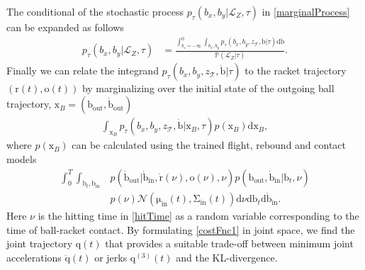 \documentclass[letterpaper, 10 pt, conference]{ieeeconf}
\newcommand{\boldvec}[1]{\boldsymbol{\mathrm{#1}}}
\let\vec\boldvec
\newcommand{\joint}{\vec{q}} %
\newcommand{\ballFull}{\vec{x}_{B}} %
\newcommand{\ball}{\vec{b}} %
\newcommand{\racket}{\vec{r}} %
\newcommand{\orient}{\vec{o}} %
\newcommand{\court}{\mathcal{T}} %
\newcommand{\prob}{\mathbb{P}} %
\newcommand{\landTime}{\tau} %
\newcommand{\landEvent}{\mathcal{L}} %
\newcommand{\hitTime}{\nu} %
\newcommand{\hitDist}{p(\nu)} %
\begin{document}
The conditional of the stochastic process $p_{\landTime}(b_x,b_y|\landEvent_Z,\landTime)$ in \eqref{marginalProcess} can be expanded as follows
%
\begin{align}
p_{\landTime}(b_x,b_y|\landEvent_{Z},\landTime) &= \frac{ \int_{\dot{b}_z=-\infty}^{0}\int_{\dot{b}_x,\dot{b}_y}p_{\landTime}(b_x,b_y,z_{\court},\dot{\ball}|\landTime)\mathrm{d}\dot{\ball}}{\prob(\landEvent_{Z}|\landTime)}.
\label{marginalDistr2}
\end{align}
%
\noindent Finally we can relate the integrand $p_{\landTime}(b_x,b_y,z_{\court},\dot{\ball}|\landTime)$ to the racket trajectory $(\racket(t),\orient(t))$ by marginalizing over the initial state of the outgoing ball trajectory, $\ballFull = (\ball_{\textrm{out}},\dot{\ball}_{\textrm{out}})$
%
\begin{align}
\int_{\ballFull}  p_{\landTime}(b_x,b_y,z_{\court},\dot{\ball}|\ballFull,\landTime) p(\ballFull)\textrm{d}\ballFull,
\label{fullDistrMarginal1}
\end{align}
%
\noindent where $p(\ballFull)$ can be calculated using the trained flight, rebound and contact models
%
\begin{align}
\int_{0}^{T}\!\int_{\ball_t,\dot{\ball}_{\mathrm{in}}}\!& p(\dot{\ball}_{\textrm{out}}|\dot{\ball}_{\textrm{in}},\dot{\racket}(\hitTime),\orient(\hitTime),\hitTime) p(\ball_{\textrm{out}},\dot{\ball}_{\textrm{in}}|\ball_t,\hitTime)\\
& p(\hitTime)\mathcal{N}(\vec{\mu}_{\mathrm{in}}(t),\vec{\Sigma}_{\mathrm{in}}(t))\textrm{d}\hitTime\textrm{d}\ball_{t}\textrm{d}\dot{\ball}_{\mathrm{in}}. %
\label{fullDistrMarginal2}
\end{align}
%
%
\noindent Here $\hitTime$ is the hitting time in \eqref{hitTime} as a random variable corresponding to the time of ball-racket contact. By formulating \eqref{costFnc1} in joint space, we find the joint trajectory $\joint(t)$ that provides a suitable trade-off between minimum joint accelerations $\ddot{\joint}(t)$ or jerks $\joint^{(3)}(t)$ and the KL-divergence. 

% 
\end{document}
